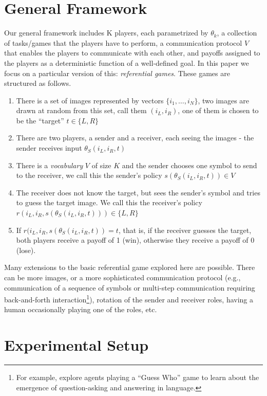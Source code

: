 \section{General Framework}
\label{sec:general-framework}

Our general framework includes K players, each parametrized by $\theta_k$, a collection of tasks/games that the players have to perform, a communication protocol $V$ that enables the players to communicate with each other, and payoffs assigned to the players as a deterministic function of a well-defined goal. In this paper we focus on a particular version of this: \textit{referential games}. These games are structured as follows.

\begin{enumerate}
\item There is a set of images represented by vectors $\lbrace i_1, \dots, i_N \rbrace$, two images are drawn at random from this set, call them $(i_L, i_R)$, one of them is chosen to be the ``target'' $t \in \lbrace L, R \rbrace$
\item There are two players, a sender and a receiver, each seeing the images - the sender receives input $\theta_S (i_L, i_R, t)$
\item There is a \textit{vocabulary} $V$ of size $K$ and the sender chooses one symbol to send to the receiver, we call this the sender's policy $s(\theta_S (i_L, i_R, t))\in V$
\item The receiver does not know the target, but sees the sender's symbol and tries to guess the target image. We call this the receiver's policy $r(i_L, i_R, s(\theta_S (i_L, i_R, t))) \in \lbrace L, R \rbrace$ 
\item If $r(i_L, i_R, s(\theta_S (i_L, i_R, t)) = t$, that is, if the receiver guesses the target, both players receive a payoff of 1 (win), otherwise they receive a payoff of 0 (lose).
\end{enumerate}

Many extensions to the basic referential game explored here are possible. There can be more images, or a more sophisticated communication protocol (e.g., communication of a sequence of symbols or multi-step communication requiring back-and-forth interaction\footnote{For example, \cite{Jorge:etal:2016} explore agents playing a ``Guess Who'' game to learn about the emergence of question-asking and answering in language.}),  rotation of the sender and receiver roles, having a human occasionally playing one of the roles, etc.

\section{Experimental Setup}
\label{sec:experimental-setup}


